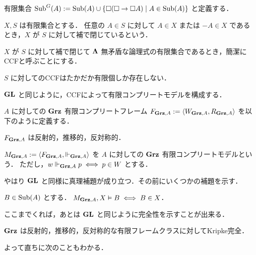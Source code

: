 \documentclass{jsarticle}
\begin{document}
\begin{definition}
	有限集合 $\mathrm{Sub}^G(A) := \mathrm{Sub}(A) \cup \{ \Box(\Box \to \Box A) \mid A \in \mathrm{Sub}(A) \}$ と定義する．
\end{definition}

\begin{definition}
	$X, S$ は有限集合とする．
	任意の $A \in S$ に対して $A \in X$ または $-A \in X$ であるとき，$X$ が $S$ に対して補で閉じているという．

	$X$ が $S$ に対して補で閉じて $\mathbf{\Lambda}$ 無矛盾な論理式の有限集合であるとき，簡潔にCCFと呼ぶことにする．
\end{definition}

\begin{lemma}
	$S$ に対してのCCFはたかだか有限個しか存在しない．
\end{lemma}

$\mathbf{GL}$ と同じように，CCFによって有限コンプリートモデルを構成する．
\begin{definition}
	$A$ に対しての $\mathbf{Grz}$ 有限コンプリートフレーム $F_{\mathbf{Grz}, A} := \langle W_{\mathbf{Grz}, A}, R_{\mathbf{Grz}, A} \rangle$ を以下のように定義する．
\end{definition}

\begin{lemma}
	$F_{\mathbf{Grz}, A}$ は反射的，推移的，反対称的．
\end{lemma}

\begin{definition}
	$M_{\mathbf{Grz}, A} := \langle F_{\mathbf{Grz}, A}, \Vdash_{\mathbf{Grz}, A} \rangle$ を $A$ に対しての $\mathbf{Grz}$ 有限コンプリートモデルという．
	ただし，$w \Vdash_{\mathbf{Grz}, A} p \iff p \in W$ とする．
\end{definition}

やはり $\mathbf{GL}$ と同様に真理補題が成り立つ．その前にいくつかの補題を示す．

\begin{lemma}\label{lem:Grz_truthlemma}
	$B \in \mathrm{Sub}(A)$ とする．
	$M_{\mathbf{Grz}, A}, X \vDash B \iff B \in X$．
\end{lemma}

ここまでくれば，あとは $\mathbf{GL}$ と同じように完全性を示すことが出来る．

\begin{theorem}
	$\mathbf{Grz}$ は反射的，推移的，反対称的な有限フレームクラスに対してKripke完全．
\end{theorem}

よって直ちに次のこともわかる．
\end{document}

